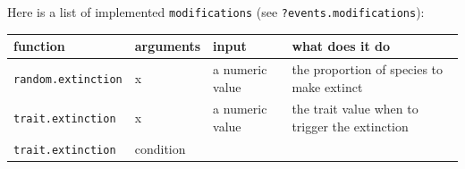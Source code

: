 \documentclass[
]{book}
\begin{document}
Here is a list of implemented \texttt{modifications} (see \texttt{?events.modifications}):

\begin{longtable}[]{@{}llll@{}}
\toprule
\begin{minipage}[b]{0.19\columnwidth}\raggedright
function\strut
\end{minipage} & \begin{minipage}[b]{0.23\columnwidth}\raggedright
arguments\strut
\end{minipage} & \begin{minipage}[b]{0.14\columnwidth}\raggedright
input\strut
\end{minipage} & \begin{minipage}[b]{0.33\columnwidth}\raggedright
what does it do\strut
\end{minipage}\tabularnewline
\midrule
\endhead
\begin{minipage}[t]{0.19\columnwidth}\raggedright
\texttt{random.extinction}\strut
\end{minipage} & \begin{minipage}[t]{0.23\columnwidth}\raggedright
x\strut
\end{minipage} & \begin{minipage}[t]{0.14\columnwidth}\raggedright
a numeric value\strut
\end{minipage} & \begin{minipage}[t]{0.33\columnwidth}\raggedright
the proportion of species to make extinct\strut
\end{minipage}\tabularnewline
\begin{minipage}[t]{0.19\columnwidth}\raggedright
\texttt{trait.extinction}\strut
\end{minipage} & \begin{minipage}[t]{0.23\columnwidth}\raggedright
x\strut
\end{minipage} & \begin{minipage}[t]{0.14\columnwidth}\raggedright
a numeric value\strut
\end{minipage} & \begin{minipage}[t]{0.33\columnwidth}\raggedright
the trait value when to trigger the extinction\strut
\end{minipage}\tabularnewline
\begin{minipage}[t]{0.19\columnwidth}\raggedright
\texttt{trait.extinction}\strut
\end{minipage} & \begin{minipage}[t]{0.23\columnwidth}\raggedright
condition\strut

\end{minipage}
\end{longtable}
\end{document}
